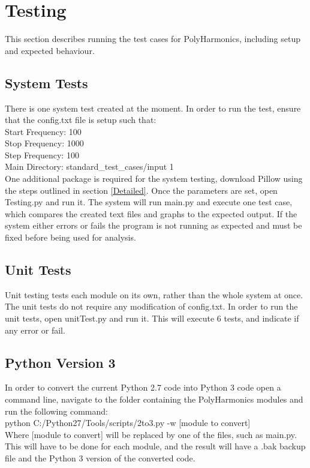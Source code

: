 \documentclass[12pt]{article}
\newcommand{\progname}{PolyHarmonics}
\begin{document}
\section{Testing}
This section describes running the test cases for \progname{}, including setup 
and expected behaviour. 
\subsection{System Tests}
There is one system test created at the moment. In order to run the test, ensure 
that the config.txt file is setup such that:\\
Start Frequency: 100\\
Stop Frequency: 1000\\
Step Frequency: 100\\
Main Directory: standard\_test\_cases/input 1\\
One additional package is required for the system testing, download Pillow using the steps outlined in section \ref{Detailed}. Once the parameters are set, open Testing.py and run it. The system will run 
main.py and execute one test case, which compares the created text files and 
graphs to the expected output. If the system either errors or fails the program 
is not running as expected and must be fixed before being used for analysis.
\subsection{Unit Tests}
Unit testing tests each module on its own, rather than the whole system at once. 
The unit tests do not require any modification of config.txt. In order to run 
the unit tests, open unitTest.py and run it. This will execute 6 tests, and 
indicate if any error or fail. 

\subsection{Python Version 3}
In order to convert the current Python 2.7 code into Python 3 code open a 
command line, navigate to the folder containing the \progname{} modules and run 
the following command:\\
python C:/Python27/Tools/scripts/2to3.py -w [module to convert]\\
Where [module to convert] will be replaced by one of the files, such as main.py.
This will have to be done for each module, and the result will have a .bak 
backup file and the Python 3 version of the converted code. 
\end{document}
